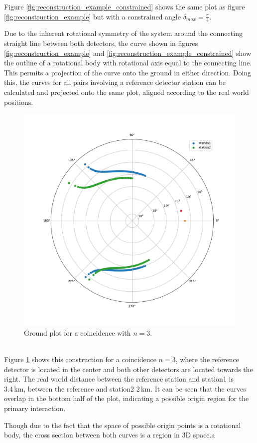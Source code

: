 \documentclass[abstract,toc,los,lof,english,10pt,glossary,acronyms,lotl]{jluthesis}
\begin{document}
Figure \ref{fig:reconstruction_example_constrained} shows the same plot as figure \ref{fig:reconstruction_example} but with a constrained angle $\delta_{max} = \frac{\pi}{4}$.

Due to the inherent rotational symmetry of the system around the connecting straight line between both detectors, the curve shown in figures \ref{fig:reconstruction_example} and \ref{fig:reconstruction_example_constrained} show the outline of a rotational body with rotational axis equal to the connecting line. This permits a projection of the curve onto the ground in either direction. Doing this, the curves for all pairs involving a reference detector station can be calculated and projected onto the same plot, aligned according to the real world positions.
\begin{figure}[ht!]
	\centering
	\includegraphics[width=0.4\linewidth]{data/example_plot_ground}
	\caption{Ground plot for a coincidence with $n=3$.}
	\label{fig:reconstruction_example_ground}
\end{figure}\\
Figure \ref{fig:reconstruction_example_ground} shows this construction for a coincidence $n=3$, where the reference detector is located in the center and both other detectors are located towards the right. The real world distance between the reference station and station1 is $3.4\,\text{km}$, between the reference and station2 $2\,\text{km}$.
It can be seen that the curves overlap in the bottom half of the plot, indicating a possible origin region for the primary interaction.


Though due to the fact that the space of possible origin points is a rotational body, the cross section between both curves is a region in 3D space.a
\end{document}
